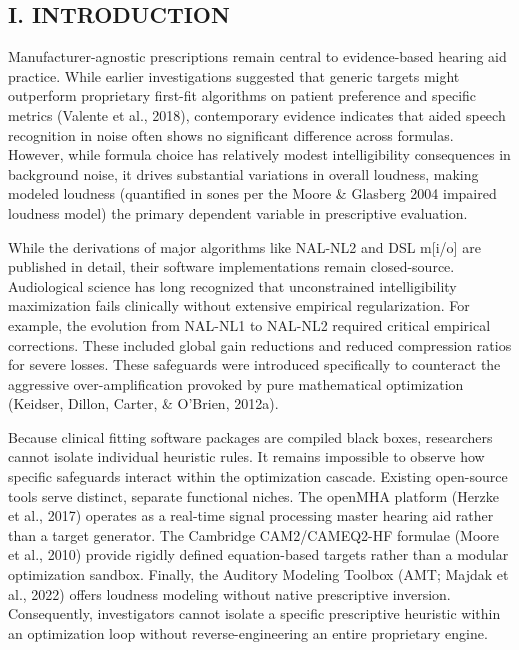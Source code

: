 \documentclass[
  12pt,
]{article}
\begin{document}
\subsection{I. INTRODUCTION}\label{i.-introduction}

Manufacturer-agnostic prescriptions remain central to evidence-based
hearing aid practice. While earlier investigations suggested that
generic targets might outperform proprietary first-fit algorithms on
patient preference and specific metrics (Valente et al., 2018),
contemporary evidence indicates that aided speech recognition in noise
often shows no significant difference across formulas. However, while
formula choice has relatively modest intelligibility consequences in
background noise, it drives substantial variations in overall loudness,
making modeled loudness (quantified in sones per the Moore \& Glasberg
2004 impaired loudness model) the primary dependent variable in
prescriptive evaluation.

While the derivations of major algorithms like NAL-NL2 and DSL
m{[}i/o{]} are published in detail, their software implementations
remain closed-source. Audiological science has long recognized that
unconstrained intelligibility maximization fails clinically without
extensive empirical regularization. For example, the evolution from
NAL-NL1 to NAL-NL2 required critical empirical corrections. These
included global gain reductions and reduced compression ratios for
severe losses. These safeguards were introduced specifically to
counteract the aggressive over-amplification provoked by pure
mathematical optimization (Keidser, Dillon, Carter, \& O'Brien, 2012a).

Because clinical fitting software packages are compiled black boxes,
researchers cannot isolate individual heuristic rules. It remains
impossible to observe how specific safeguards interact within the
optimization cascade. Existing open-source tools serve distinct,
separate functional niches. The openMHA platform (Herzke et al., 2017)
operates as a real-time signal processing master hearing aid rather than
a target generator. The Cambridge CAM2/CAMEQ2-HF formulae (Moore et al.,
2010) provide rigidly defined equation-based targets rather than a
modular optimization sandbox. Finally, the Auditory Modeling Toolbox
(AMT; Majdak et al., 2022) offers loudness modeling without native
prescriptive inversion. Consequently, investigators cannot isolate a
specific prescriptive heuristic within an optimization loop without
reverse-engineering an entire proprietary engine.
\end{document}
